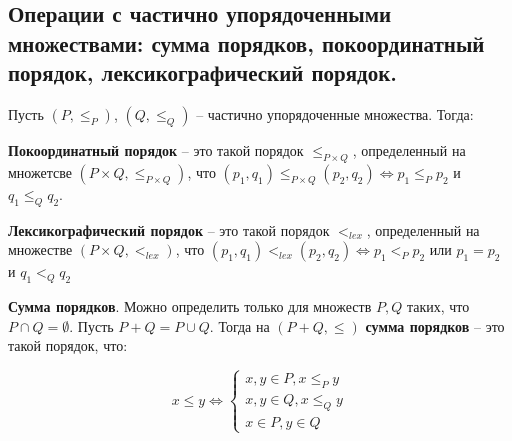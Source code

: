 \subsection{Операции с частично упорядоченными множествами: сумма порядков, покоординатный порядок, лексикографический порядок.}

Пусть $(P, \le_P)$, $(Q, \le_Q)$ -- частично упорядоченные множества. Тогда:

\textbf{Покоординатный порядок} -- это такой порядок $\le_{P \times Q}$, определенный на множетсве $(P \times Q, \le_{P \times Q})$, что $(p_1, q_1) \le_{P \times Q} (p_2, q_2) \Leftrightarrow p_1 \le_P p_2$ и $q_1 \le_Q q_2$.

\textbf{Лексикографический порядок} -- это такой порядок $<_{lex}$, определенный на множестве $(P \times Q, <_{lex})$, что $(p_1, q_1) <_{lex} (p_2, q_2) \Leftrightarrow p_1 <_P p_2$ или $p_1 = p_2$ и $q_1 <_Q q_2$

\textbf{Сумма порядков}. Можно определить только для множеств $P, Q$ таких, что $P \cap Q = \emptyset$. Пусть $P + Q = P \cup Q$. Тогда на $(P + Q, \le)$ \textbf{сумма порядков} -- это такой порядок, что:

\begin{equation*}
    x \le y \Leftrightarrow
    \begin{cases}
        x, y \in P, x \le_P y \\
        x, y \in Q, x \le_Q y \\
        x \in P, y \in Q
    \end{cases}
\end{equation*}
